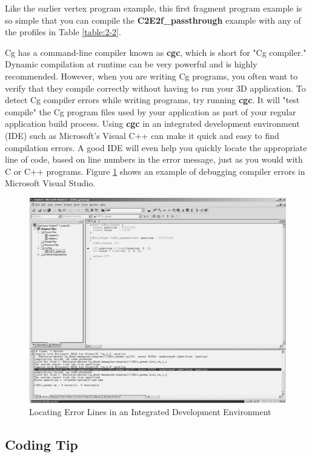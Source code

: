 \documentclass{book}
\begin{document}
Like the earlier vertex program example, this first fragment program example is so simple that you can compile the \textbf{C2E2f_passthrough} example with any of the profiles in Table \ref{table:2-2}.

Cg has a command-line compiler known as \textbf{cgc}, which is short for "Cg compiler." Dynamic compilation at runtime can be very powerful and is highly recommended. However, when you are writing Cg programs, you often want to verify that they compile correctly without having to run your 3D application. To detect Cg compiler errors while writing programs, try running \textbf{cgc}. It will "test compile" the Cg program files used by your application as part of your regular application build process. Using \textbf{cgc} in an integrated development environment (IDE) such as Microsoft's Visual C++ can make it quick and easy to find compilation errors. A good IDE will even help you quickly locate the appropriate line of code, based on line numbers in the error message, just as you would with C or C++ programs. Figure \ref{fig:2-3} shows an example of debugging compiler errors in Microsoft Visual Studio.

\begin{figure}
    \centering
    \includegraphics[width=1\linewidth]{Images/fig2_3.jpg}
    \caption{Locating Error Lines in an Integrated Development Environment}
    \label{fig:2-3}
\end{figure}

\subsection*{Coding Tip}
\end{document}
